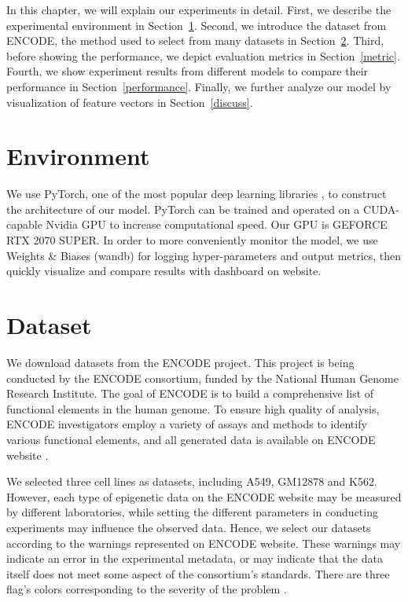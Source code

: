 \hspace{24pt}
\renewcommand{\baselinestretch}{1.5}
\newcommand{\subSCPT}[1]{\hspace{0.08em}\textsubscript{#1}}
\newcommand{\stratified}{\subSCPT{stratified}}

In this chapter, we will explain our experiments in detail. First, we describe the experimental environment in Section~\ref{environment}. Second, we introduce the dataset from ENCODE, the method used to select from many datasets in Section~\ref{dataset}. Third, before showing the performance, we depict evaluation metrics in Section~\ref{metric}. Fourth, we show experiment results from different models to compare their performance in Section~\ref{performance}. Finally, we further analyze our model by visualization of feature vectors in Section~\ref{discuss}.

\section{Environment} \label{environment}
We use PyTorch, one of the most popular deep learning libraries \cite{paszke2017automatic}, to construct the architecture of our model.  PyTorch can be trained and operated on a CUDA-capable Nvidia GPU to increase computational speed.  Our GPU is GEFORCE RTX 2070 SUPER. In order to more conveniently monitor the model, we use Weights \& Biases (wandb) \cite{wandb} for logging hyper-parameters and output metrics, then quickly visualize and compare results with dashboard on website.

\section{Dataset} \label{dataset}
We download datasets from the ENCODE project. This project is being conducted by the ENCODE consortium, funded by the National Human Genome Research Institute. The goal of ENCODE is to build a comprehensive list of functional elements in the human genome. To ensure high quality of analysis, ENCODE investigators employ a variety of assays and methods to identify various functional elements, and all generated data is available on ENCODE website \cite{davis2018encyclopedia}.

We selected three cell lines as datasets, including A549, GM12878 and K562. However, each type of epigenetic data on the ENCODE website may be measured by different laboratories, while setting the different parameters in conducting experiments may influence the observed data. Hence, we select our datasets according to the warnings represented on ENCODE website. These warnings may indicate an error in the experimental metadata, or may indicate that the data itself does not meet some aspect of the consortium’s standards. There are three flag’s colors corresponding to the severity of the problem \cite{davis2018encyclopedia}.

